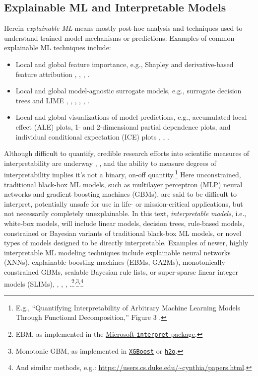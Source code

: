 \documentclass{article}
\begin{document}
\subsection{Explainable ML and Interpretable Models }

Herein \textit{explainable ML} means mostly post-hoc analysis and techniques used to understand trained model mechanisms or predictions. Examples of common explainable ML techniques include:

\begin{itemize}
\item Local and global feature importance, e.g., Shapley and derivative-based feature attribution \cite{grad_attr} \cite{keinan2004fair}, \cite{shapley}, \cite{shapley1988shapley}, \cite{kononenko2010efficient}.
\item Local and global model-agnostic surrogate models, e.g., surrogate decision trees and LIME \cite{dt_surrogate2}, \cite{viper}, \cite{dt_surrogate1}, \cite{lime-sup}, \cite{lime}, \cite{wf_xnn}. 
\item Local and global visualizations of model predictions, e.g., accumulated local effect (ALE) plots, 1- and 2-dimensional partial dependence plots, and individual conditional expectation (ICE) plots \cite{ale_plot}, \cite{esl}, \cite{ice_plots}.
\end{itemize}  

Although difficult to quantify, credible research efforts into scientific measures of interpretability are underway \cite{friedler2019assessing}, \cite{molnar2019quantifying}, and the ability to measure degrees of interpretability implies it's not a binary, on-off quantity.\footnote{\scriptsize{E.g., ``Quantifying Interpretability of Arbitrary Machine Learning Models Through Functional Decomposition,'' Figure 3 \cite{molnar2019quantifying}.}} Here unconstrained, traditional black-box ML models, such as multilayer perceptron (MLP) neural networks and gradient boosting machines (GBMs), are said to be difficult to interpret, potentially unsafe for use in life- or mission-critical applications, but not necessarily completely unexplainable. In this text, \textit{interpretable models}, i.e., white-box models, will include linear models, decision trees, rule-based models, constrained or Bayesian variants of traditional black-box ML models, or novel types of models designed to be directly interpretable. Examples of newer, highly interpretable ML modeling techniques include explainable neural networks (XNNs), explainable boosting machines (EBMs, GA2Ms), monotonically constrained GBMs, scalable Bayesian rule lists, or super-sparse linear integer models (SLIMs), \cite{ga2m}, \cite{slim}, \cite{wf_xnn}, \cite{sbrl}.\footnote{\scriptsize{EBM, as implemented in the \href{https://github.com/microsoft/interpret}{Microsoft \texttt{interpret} package}.}}\textsuperscript{,}\footnote{\scriptsize{Monotonic GBM, as implemented in \href{https://xgboost.readthedocs.io/en/latest/tutorials/monotonic.html}{\texttt{XGBoost}} or \href{https://github.com/h2oai/h2o-3/blob/master/h2o-py/demos/H2O_tutorial_gbm_monotonicity.ipynb}{\texttt{h2o}}.}}\textsuperscript{,}\footnote{\scriptsize{And similar methods, e.g.: \url{https://users.cs.duke.edu/~cynthia/papers.html}}.}
\end{document}
